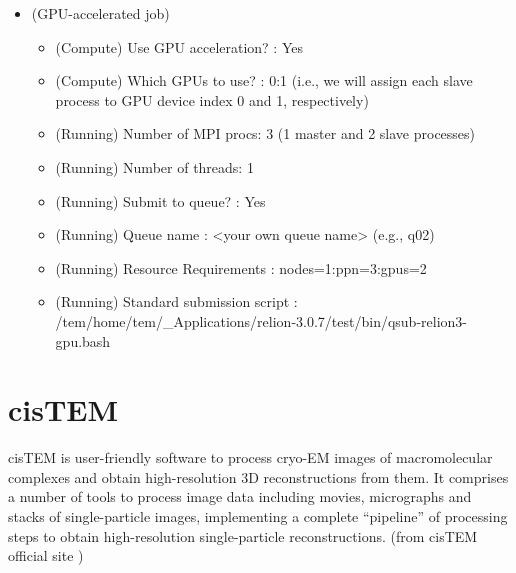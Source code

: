 \documentclass[letterpaper,10pt,english]{sphinxmanual}
\begin{document}
\begin{itemize}
\item {} 
 (GPU-accelerated job)
\begin{itemize}
\item {} 
(Compute) Use GPU acceleration? : Yes

\item {} 
(Compute) Which GPUs to use? : 0:1 (i.e., we will assign each slave process to GPU device index 0 and 1, respectively)

\item {} 
(Running) Number of MPI procs: 3 (1 master and 2 slave processes)

\item {} 
(Running) Number of threads: 1

\item {} 
(Running) Submit to queue? : Yes

\item {} 
(Running) Queue name : \textless{}your own queue name\textgreater{} (e.g., q02)

\item {} 
(Running) Resource Requirements : nodes=1:ppn=3:gpus=2

\item {} 
(Running) Standard submission script : /tem/home/tem/\_Applications/relion-3.0.7/test/bin/qsub-relion3-gpu.bash

\end{itemize}

\end{itemize}




\chapter{cisTEM}
\label{\detokenize{cisTEM:cistem}}\label{\detokenize{cisTEM::doc}}
cisTEM is user-friendly software to process cryo-EM images of macromolecular complexes and obtain high-resolution 3D reconstructions from them. It comprises a number of tools to process image data including movies, micrographs and stacks of single-particle images, implementing a complete “pipeline” of processing steps to obtain high-resolution single-particle reconstructions. (from cisTEM official site )
\end{document}
